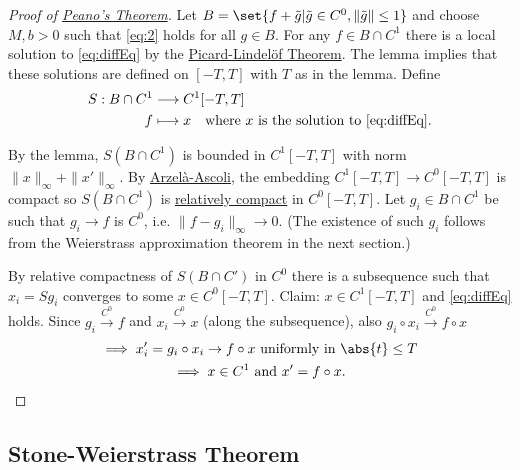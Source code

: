 \documentclass{article}
\begin{document}
\begin{proof}[Proof of \hyperlink{thm:peano}{Peano's Theorem}]
    Let $B = \set{f + \tilde{g} | \tilde{g} \in C^0, \|\tilde{g}\| \leq 1}$ and choose $M, b > 0$ such that \eqref{eq:2} holds for all $g \in B$.
    For any $f \in B \cap C^1$ there is a local solution to \eqref{eq:diffEq} by the \hyperlink{thm:picard}{Picard-Lindel\"of Theorem}.
    The lemma implies that these solutions are defined on $[-T,T]$ with $T$ as in the lemma.
    Define
    \begin{align*}
        S:B \cap C^1 &\longrightarrow C^1[-T, T] \\
        f &\longmapsto x \quad \text{where $x$ is the solution to \eqref{eq:diffEq}.}
    \end{align*}

    By the lemma, $S(B \cap C^1)$ is bounded in $C^1[-T, T]$ with norm $\|x\|_\infty + \|x'\|_\infty$.
    By \hyperlink{thm:aa}{Arzel\`a-Ascoli}, the embedding $C^1[-T, T] \to C^0 [-T, T]$ is compact so $S(B \cap C^1)$ is \hyperlink{def:relCompact}{relatively compact} in $C^0[-T, T]$.
    Let $g_i \in B \cap C^1$ be such that $g_i \to f$ is $C^0$, i.e. $\|f - g_i\|_\infty \to 0$.
    (The existence of such $g_i$ follows from the Weierstrass approximation theorem in the next section.)

    By relative compactness of $S(B \cap C')$ in $C^0$ there is a subsequence such that $x_i = S g_i$ converges to some $x \in C^0[-T, T]$.
    Claim: $x \in C^1[-T, T]$ and \eqref{eq:diffEq} holds.
    Since $g_i \xrightarrow{C^0} f$ and $x_i \xrightarrow{C^0} x$ (along the subsequence), also $g_i \circ x_i \xrightarrow{C^0} f \circ x$
    \begin{gather*}
        \implies x_i' = g_i \circ x_i \to f \circ x \text{ uniformly in } \abs{t} \leq T \\
        \implies x \in C^1 \text{ and } x' = f \circ x. \qedhere
    \end{gather*}
\end{proof}


\subsection{Stone-Weierstrass Theorem}

\end{document}

